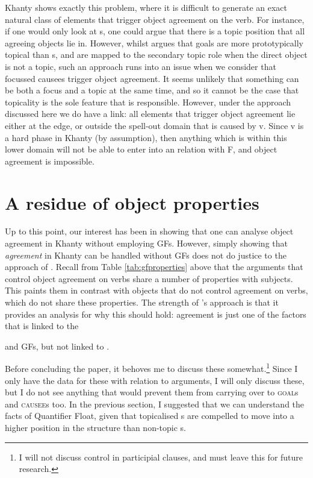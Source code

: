 \documentclass[output=paper
,modfonts
,nonflat]{langsci/langscibook}
\begin{document}
Khanty shows exactly this problem, where it is difficult to generate an exact natural class of elements that trigger object agreement on the verb. 
For instance, if one would only look at \theme s, one could argue that there is a topic position that all agreeing objects lie in.
However, whilst \citet{nikolaeva2001} argues that goals are more prototypically topical than \theme s, and are mapped to the secondary topic role when the direct object is not a topic, such an approach runs into an issue when we consider that focussed causees trigger object agreement.
It seems unlikely that something can be both a focus and a topic at the same time, and so it cannot be the case that topicality is the sole feature that is responsible.
However, under the approach discussed here we do have a link: all elements that trigger object agreement lie either at the edge, or outside the spell-out domain that is caused by v. 
Since v is a hard phase in Khanty (by assumption), then anything which is within this lower domain will not be able to enter into an \agree {} relation with F, and object agreement is impossible.

\section{A residue of object properties}\label{residue}

Up to this point, our interest has been in showing that one can analyse object agreement in Khanty without employing GFs. 
However, simply showing that \emph{agreement} in Khanty can be handled without GFs does not do justice to the approach of \citet{dn2011}.
Recall from Table \ref{tab:gfproperties} above that the arguments that control object agreement on verbs share a number of properties with subjects. 
This paints them in contrast with objects that do not control agreement on verbs, which do not share these properties. 
The strength of \citeauthor{dn2011}'s approach is that it provides an analysis for why this should hold: agreement is just one of the factors that is linked to the \subject {} and \object {} GFs, but not linked to \robj.

Before concluding the paper, it behoves me to discuss these somewhat.\footnote{I will not discuss control in participial clauses, and must leave this for future research.} 
Since I only have the data for these with relation to \theme {} arguments, I will only discuss these, but I do not see anything that would prevent them from carrying over to \textsc{goal}s and \textsc{causee}s too.
In the previous section, I suggested that we can understand the facts of Quantifier Float, given that topicalised \theme s are compelled to move into a higher position in the structure than non-topic \theme s.
\end{document}
